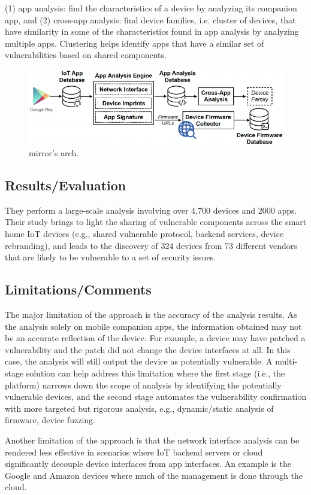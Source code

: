 (1) app analysis: find the characteristics of a device by analyzing its companion app, and (2) cross-app analysis: find device families, i.e. cluster of devices, that have similarity in some of the characteristics found in app analysis by analyzing multiple apps. Clustering helps identify apps that have a similar set of vulnerabilities based on shared components.
\begin{figure}[h]
    \centering
    \includegraphics[width=0.9\linewidth]{mirror.png} %
    \caption{mirror's arch.}	
    \label{fig:mirror}
\end{figure}
\subsection{Results/Evaluation}
They perform a large-scale analysis involving over 4,700 devices and  2000 apps. Their study brings to light the sharing of vulnerable components across the smart home IoT devices (e.g., shared vulnerable protocol, backend services, device rebranding), and leads to the discovery of 324 devices from 73 different vendors that are likely to be vulnerable to a set of security issues.

\subsection{Limitations/Comments}
The major limitation of the approach is the accuracy of the analysis results. As the analysis solely on mobile companion apps, the information obtained may not be an accurate reflection of the device. For example, a device may have patched a vulnerability and the patch did not change the device interfaces at all. In this case, the analysis will still output the device as potentially vulnerable. A multi-stage solution can help address this limitation where the first stage (i.e., the platform) narrows down the scope of analysis by identifying the potentially vulnerable devices, and the second stage automates the vulnerability confirmation with more targeted but rigorous analysis, e.g., dynamic/static analysis of firmware, device fuzzing.

Another limitation of the approach is that the network interface analysis can be rendered less effective in scenarios where IoT backend servers or cloud significantly decouple device interfaces from app interfaces. An example is the Google and Amazon devices where much of the management is done through the cloud.

